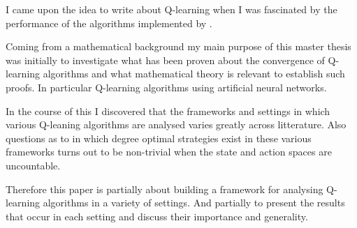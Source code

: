 
I came upon the idea to write about Q-learning when
I was fascinated by the performance of the algorithms
implemented by .

Coming from a mathematical background
my main purpose of this master thesis was initially
to investigate what has been proven
about the convergence of Q-learning algorithms
and what mathematical theory is relevant to establish such proofs.
In particular Q-learning algorithms using
artificial neural networks.

In the course of this I discovered that the frameworks
and settings in which various Q-leaning algorithms are analysed
varies greatly across litterature.
Also questions as to in which degree optimal strategies
exist in these various frameworks turns out to be
non-trivial when the state and action spaces are uncountable.

Therefore this paper is partially about building a framework
for analysing Q-learning algorithms in a variety of settings.
And partially to present the results that occur in each setting
and discuss their importance and generality.

